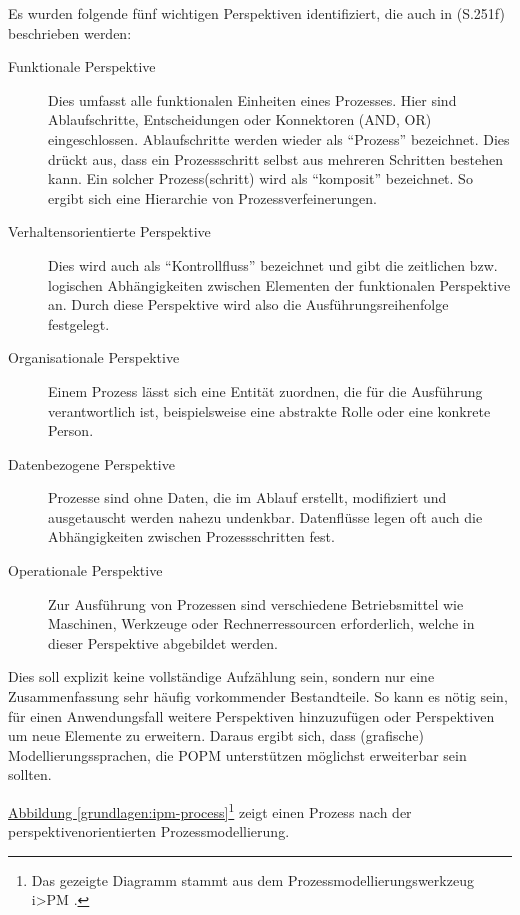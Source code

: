 \documentclass[a4paper,10pt]{sphinxmanual}
\begin{document}
Es wurden folgende fünf wichtigen Perspektiven identifiziert, die auch in \cite{volz_werkzeugunterstutzung_2011} (S.251f) beschrieben werden:
\begin{description}
\item[{Funktionale Perspektive}] \leavevmode
Dies umfasst alle funktionalen Einheiten eines Prozesses. Hier sind Ablaufschritte, Entscheidungen oder Konnektoren (AND, OR) eingeschlossen. Ablaufschritte werden wieder als "`Prozess"' bezeichnet. Dies drückt aus, dass ein Prozessschritt selbst aus mehreren Schritten bestehen kann. Ein solcher Prozess(schritt) wird als "`komposit"' bezeichnet. So ergibt sich eine Hierarchie von Prozessverfeinerungen.

\item[{Verhaltensorientierte Perspektive}] \leavevmode
Dies wird auch als "`Kontrollfluss"' bezeichnet und gibt die zeitlichen bzw. logischen Abhängigkeiten zwischen Elementen der funktionalen Perspektive an. Durch diese Perspektive wird also die Ausführungsreihenfolge festgelegt.

\item[{Organisationale Perspektive}] \leavevmode
Einem Prozess lässt sich eine Entität zuordnen, die für die Ausführung verantwortlich ist, beispielsweise eine abstrakte Rolle oder eine konkrete Person.

\item[{Datenbezogene Perspektive}] \leavevmode
Prozesse sind ohne Daten, die im Ablauf erstellt, modifiziert und ausgetauscht werden nahezu undenkbar. Datenflüsse legen oft auch die Abhängigkeiten zwischen Prozessschritten fest.

\item[{Operationale Perspektive}] \leavevmode
Zur Ausführung von Prozessen sind verschiedene Betriebsmittel wie Maschinen, Werkzeuge oder Rechnerressourcen erforderlich, welche in dieser Perspektive abgebildet werden.

\end{description}

Dies soll explizit keine vollständige Aufzählung sein, sondern nur eine Zusammenfassung sehr häufig vorkommender Bestandteile.
So kann es nötig sein, für einen Anwendungsfall weitere Perspektiven hinzuzufügen oder Perspektiven um neue Elemente zu erweitern.
Daraus ergibt sich, dass (grafische) Modellierungssprachen, die POPM unterstützen möglichst erweiterbar sein sollten.

\hyperref[grundlagen:ipm-process]{Abbildung  \ref*{grundlagen:ipm-process}}\footnote{
Das gezeigte Diagramm stammt aus dem Prozessmodellierungswerkzeug i\textgreater{}PM \cite{ipm}.
} zeigt einen Prozess nach der perspektivenorientierten Prozessmodellierung.
\end{document}
